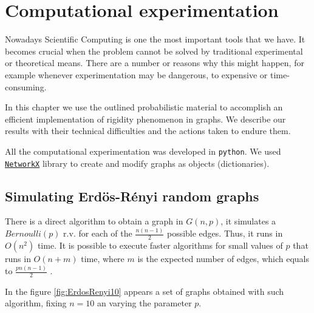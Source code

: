 
\chapter{Computational experimentation} %

\label{Chapter3} %



Nowadays Scientific Computing is one the most important tools that we have. It becomes crucial when the problem cannot be solved by traditional experimental or theoretical means. There are a number or reasons why this might happen, for example whenever experimentation may be dangerous, to expensive or time-consuming.

In this chapter we use the outlined probabilistic material to accomplish an efficient implementation of rigidity phenomenon in graphs. We describe our results with their technical difficulties and the actions taken to endure them.

All the computational experimentation was developed in \texttt{python}. We used \texttt{\href{https://networkx.github.io/}{NetworkX}} library to create and modify graphs as objects (dictionaries).

\section{Simulating Erdös-Rényi random graphs}

There is a direct algorithm to obtain a graph in $G(n,p)$, it simulates a $Bernoulli(p)$ r.v. for each of the $\frac{n(n-1)}{2}$ possible edges. Thus, it runs in $O(n^2)$ time. It is possible to execute faster algorithms for small values of $p$ that runs in $O(n + m)$ time, where $m$ is the expected number of edges, which equals to $\frac{pn(n - 1)}{2}$ \cite[Batagelj, Brandes 05]{fastER}.

In the figure \ref{fig:ErdosRenyi10} appears a set of graphs obtained with such algorithm, fixing $n=10$ an varying the parameter $p$.

